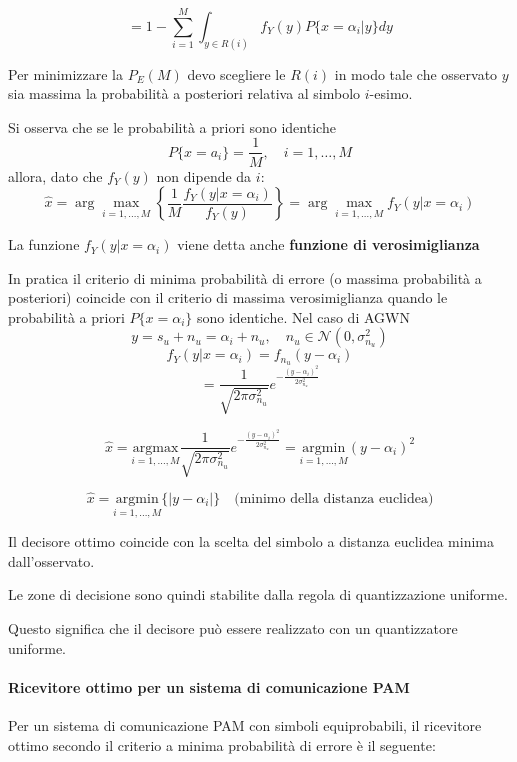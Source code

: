 \documentclass{article}
\begin{document}
\[
= 1 - \sum_{i=1}^M \int_{y \in R(i)} f_Y(y) P\{x = \alpha_i | y\} dy
\]

Per minimizzare la $P_E(M)$ devo scegliere le $R(i)$ in modo tale che osservato $y$ sia massima la probabilità a posteriori relativa al simbolo $i$-esimo.

Si osserva che se le probabilità a priori sono identiche
\[
P\{x = a_i\} = \frac{1}{M}, \quad i=1,\ldots,M
\]
allora, dato che $f_Y(y)$ non dipende da $i$:
\[
\hat{x} = \arg \max_{i=1,\ldots,M} \left\{ \frac{1}{M} \frac{f_Y(y | x = \alpha_i)}{f_Y(y)} \right\} = \arg \max_{i=1,\ldots,M} f_Y(y | x = \alpha_i) 
\]


La funzione $f_Y(y|x=\alpha_i)$ viene detta anche \textbf{funzione di verosimiglianza}

In pratica il criterio di minima probabilità di errore (o massima probabilità a posteriori) coincide con il criterio di massima verosimiglianza quando le probabilità a priori $P\{x=\alpha_i\}$ sono identiche.
Nel caso di AGWN
\[
y = s_u + n_u = \alpha_i + n_u, \quad n_u \in \mathcal{N}(0,\sigma_{n_u}^2)
\]
\[
f_Y(y|x = \alpha_i) = f_{n_u}(y - \alpha_i)
\]
\[
= \frac{1}{\sqrt{2\pi\sigma_{n_u}^2}} e^{-\frac{(y-\alpha_i)^2}{2\sigma_{n_u}^2}}
\]

\[
\hat{x} = \underset{i=1,\ldots,M}{\mathrm{argmax}} \frac{1}{\sqrt{2\pi\sigma_{n_u}^2}} e^{-\frac{(y-\alpha_i)^2}{2\sigma_{n_u}^2}} = \underset{i=1,\ldots,M}{\mathrm{argmin}}  (y - \alpha_i)^2 
\]

\[
\boxed{
  \hat{x} = \underset{i=1,\ldots,M}{\mathrm{argmin}} \{ |y-\alpha_i| \}
} \quad \text{(minimo della distanza euclidea)}
\]


Il decisore ottimo coincide con la scelta del simbolo a distanza euclidea minima dall'osservato.

Le zone di decisione sono quindi stabilite dalla regola di quantizzazione uniforme.

Questo significa che il decisore può essere realizzato con un quantizzatore uniforme.


\paragraph{Ricevitore ottimo per un sistema di comunicazione PAM}

Per un sistema di comunicazione PAM con simboli equiprobabili, il ricevitore ottimo secondo il criterio a minima probabilità di errore è il seguente:
\end{document}

